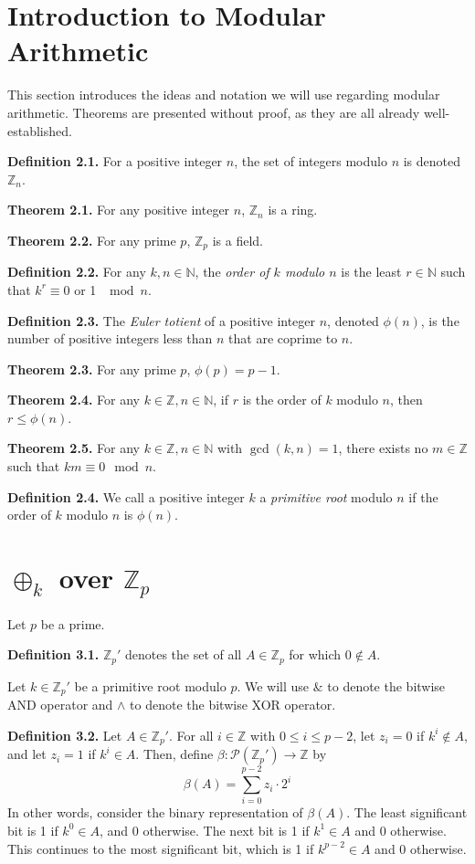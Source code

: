 \documentclass{article}
\newcommand{\zee}{\mathbb{Z}}
\newcommand{\N}{\mathbb{N}}
\begin{document}
\section{Introduction to Modular Arithmetic}

This section introduces the ideas and notation we will use regarding
modular arithmetic.
Theorems are presented without proof,
as they are all already well-established.

\textbf{Definition 2.1.} For a positive integer $n$, the set of integers
modulo $n$ is denoted $\zee_n$.

\textbf{Theorem 2.1.} For any positive integer $n$, $\zee_n$ is a ring.

\textbf{Theorem 2.2.} For any prime $p$, $\zee_p$ is a field.

\textbf{Definition 2.2.} For any $k, n \in \N$, the \textit{order
of $k$ modulo $n$} is the least $r \in \N$ such that
$k^r \equiv 0$ or 1 $\mod n$.

\textbf{Definition 2.3.} The \textit{Euler totient} of a
positive integer $n$,
denoted $\phi(n)$, is the number of positive integers less than $n$
that are coprime to $n$.

\textbf{Theorem 2.3.} For any prime $p$, $\phi(p) = p - 1$.

\textbf{Theorem 2.4.} For any $k \in \zee, n \in \N$, if $r$ is the order of
$k$ modulo $n$, then $r \leq \phi(n)$.

\textbf{Theorem 2.5.} For any $k \in \zee, n \in \N$ with
$\gcd(k, n) = 1$, there exists no $m \in \zee$ such that
$km \equiv 0 \mod n$.

\textbf{Definition 2.4.} We call a positive integer $k$ a
\textit{primitive root} modulo $n$ if the order of $k$ modulo $n$
is $\phi(n)$.

\section{$\oplus_k$ over $\zee_p$}

Let $p$ be a prime.

\textbf{Definition 3.1.} $\zee_p'$ denotes the set of all
$A \in \zee_p$ for which $0 \not\in A$.

Let $k \in \zee_p'$ be a primitive root modulo $p$.
We will use $\&$ to denote the bitwise AND operator
and $\wedge$ to denote the bitwise XOR operator.

\textbf{Definition 3.2.} Let $A \in \zee_p'$. For all $i \in \zee$
with $0 \leq i \leq p - 2$, let $z_i = 0$ if $k^i \not\in A$,
and let $z_i = 1$ if $k^i \in A$. Then, define
$\beta: \mathcal{P}(\zee_p') \rightarrow \zee$ by
\[\beta(A) = \sum_{i = 0}^{p-2} z_i \cdot 2^{i}\]
In other words, consider the binary representation of $\beta(A)$.
The least significant bit is 1 if $k^0 \in A$, and 0 otherwise.
The next bit is 1 if $k^1 \in A$ and 0 otherwise.
This continues to the most significant bit,
which is 1 if $k^{p-2} \in A$ and 0 otherwise.
\end{document}
